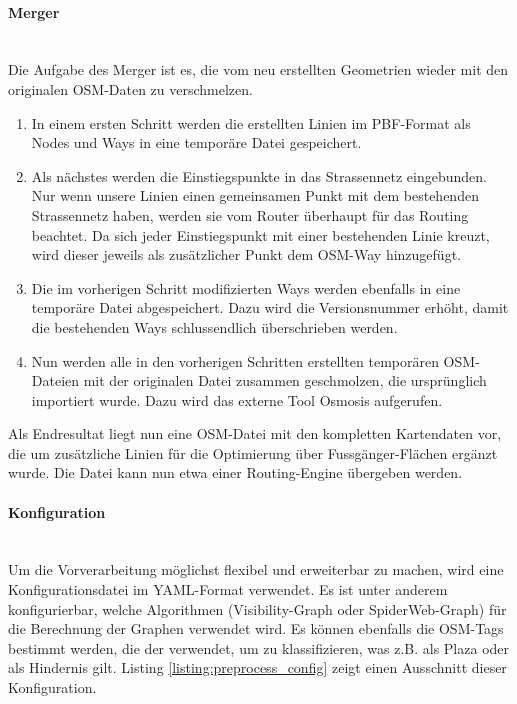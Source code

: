 \paragraph{Merger}\label{impl:Merger}~\\
Die Aufgabe des Merger ist es, die vom  neu erstellten Geometrien wieder mit den originalen \ac{OSM}-Daten zu verschmelzen.
\begin{enumerate}
    \item In einem ersten Schritt werden die erstellten Linien im \ac{PBF}-Format als Nodes und Ways in eine temporäre Datei gespeichert.
    \item Als nächstes werden die Einstiegspunkte in das Strassennetz eingebunden. Nur wenn unsere Linien einen gemeinsamen Punkt mit dem bestehenden Strassennetz haben, werden sie vom Router überhaupt für das Routing beachtet. Da sich jeder Einstiegspunkt mit einer bestehenden Linie kreuzt, wird dieser jeweils als zusätzlicher Punkt dem \ac{OSM}-Way hinzugefügt.
    \item Die im vorherigen Schritt modifizierten Ways werden ebenfalls in eine temporäre Datei abgespeichert. Dazu wird die Versionsnummer erhöht, damit die bestehenden Ways schlussendlich überschrieben werden.
    \item Nun werden alle in den vorherigen Schritten erstellten temporären \ac{OSM}-Dateien mit der originalen Datei zusammen geschmolzen, die ursprünglich importiert wurde. Dazu wird das externe Tool Osmosis \cite{osmosis} aufgerufen.
\end{enumerate}

Als Endresultat liegt nun eine \ac{OSM}-Datei mit den kompletten Kartendaten vor, die um zusätzliche Linien für die Optimierung über Fussgänger-Flächen ergänzt wurde. Die Datei kann nun etwa einer Routing-Engine übergeben werden.

\paragraph{Konfiguration}\label{impl:preprocess_konfiguration}~\\
Um die Vorverarbeitung möglichst flexibel und erweiterbar zu machen, wird eine Konfigurationsdatei im YAML-Format verwendet. Es ist unter anderem konfigurierbar, welche Algorithmen (Visibility-Graph oder SpiderWeb-Graph) für die Berechnung der Graphen verwendet wird. Es können ebenfalls die \ac{OSM}-Tags bestimmt werden, die der  verwendet, um zu klassifizieren, was z.B. als Plaza oder als Hindernis gilt. Listing \ref{listing:preprocess_config} zeigt einen Ausschnitt dieser Konfiguration.

